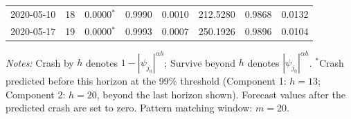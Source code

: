 \begin{table}[ht]
{\begin{tabular}{lrcccccc}
2020-05-10 & 18 & 0.0000$^*$ & 0.9990 & 0.0010 & 212.5280 & 0.9868 & 0.0132 \\
2020-05-17 & 19 & 0.0000$^*$ & 0.9993 & 0.0007 & 250.1926 & 0.9896 & 0.0104 \\
\bottomrule
\end{tabular}}
\begin{flushleft}
\footnotesize\textit{Notes:} Crash by $h$ denotes $1-|\psi_{j_0}|^{\alpha h}$; Survive beyond $h$ denotes $|\psi_{j_0}|^{\alpha h}$. $^*$Crash predicted before this horizon at the 99\% threshold (Component 1: $h=13$; Component 2: $h=20$, beyond the last horizon shown). Forecast values after the predicted crash are set to zero. Pattern matching window: $m=20$.
\end{flushleft}
\end{table}
